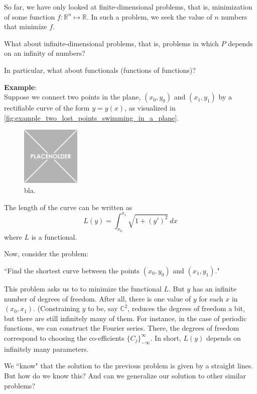 So far, we have only looked at finite-dimensional problems, that is, minimization of some function $f: \mathbb{R}^n \mapsto \mathbb{R}$. 
In such a problem, we seek the value of $n$ numbers that minimize $f$. 

What about infinite-dimensional problems, that is, problems in which $P$ depends on an infinity of numbers?

In particular, what about functionals (functions of functions)?

\bigbreak
\noindent \textbf{Example}:\\
Suppose we connect two points in the plane, $(x_0, y_0)$ and $(x_1, y_1)$ by a rectifiable curve of the form $y = y(x)$, as visualized in \autoref{fig:example_two_lost_points_swimming_in_a_plane}. 

\begin{figure}
    \centering
    \includegraphics[width=0.25\textwidth]{figures/placeholder.png}
    \caption{bla.}
    \label{fig:example_two_lost_points_swimming_in_a_plane}
\end{figure}

The length of the curve can be written as
\begin{equation*}
L(y) = \int_{x_0}^{x_1} {\sqrt{1 + (y')^2}} \ dx
\end{equation*}
where $L$ is a functional. 

Now, consider the problem: 

``Find the shortest curve between the points $(x_0, y_0)$ and $(x_1, y_1)$."

This problem asks us to to minimize the functional $L$. 
But $y$ has an infinite number of degrees of freedom. After all, there is one value of $y$ for each $x$ in $(x_0, x_1)$. 
(Constraining $y$ to be, say $\mathbb{C}^2$, reduces the degrees of freedom a bit, but there are still infinitely many of them. 
For instance, in the case of periodic functions, we can construct the Fourier series. 
There, the degrees of freedom correspond to choosing the co-efficients $\{C_j\}^\infty_{-\infty}$. 
In short, $L(y)$ depends on infinitely many parameters. 

We ``know" that the solution to the previous problem is given by a straight lines. 
But how do we know this?
And can we generalize our solution to other similar problems? 

